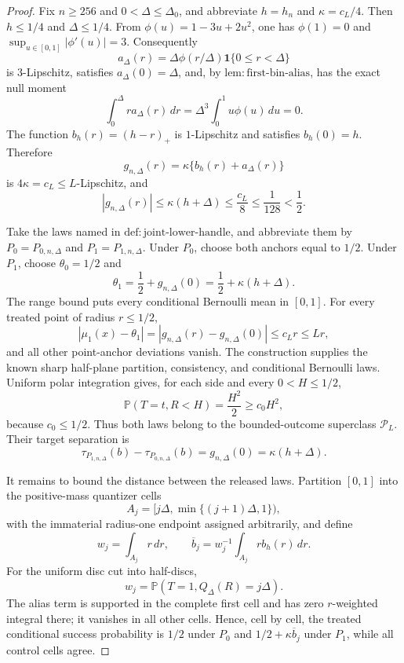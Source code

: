\documentclass{article}
\begin{document}
\begin{proof}
Fix \(n\geq256\) and \(0<\Delta\leq\Delta_0\), and abbreviate \(h=h_n\) and \(\kappa=c_L/4\).  Then \(h\leq1/4\) and \(\Delta\leq1/4\).  From \(\phi(u)=1-3u+2u^2\), one has \(\phi(1)=0\) and \(\sup_{u\in[0,1]}|\phi'(u)|=3\).  Consequently
\[
 a_\Delta(r)=\Delta\phi(r/\Delta)\mathbf1\{0\leq r<\Delta\}
\]
is \(3\)-Lipschitz, satisfies \(a_\Delta(0)=\Delta\), and, by \(\mathrm{lem:first\text{-}bin\text{-}alias}\), has the exact null moment
\[
 \int_0^\Delta ra_\Delta(r)\,dr
 =\Delta^3\int_0^1u\phi(u)\,du=0.
\]
The function \(b_h(r)=(h-r)_+\) is \(1\)-Lipschitz and satisfies \(b_h(0)=h\).  Therefore
\[
 g_{n,\Delta}(r)=\kappa\{b_h(r)+a_\Delta(r)\}
\]
is \(4\kappa=c_L\leq L\)-Lipschitz, and
\[
 |g_{n,\Delta}(r)|
 \leq\kappa(h+\Delta)
 \leq\frac{c_L}{8}
 \leq\frac1{128}<\frac12.
\]

Take the laws named in \(\mathrm{def:joint\text{-}lower\text{-}handle}\), and abbreviate them by \(P_0=P_{0,n,\Delta}\) and \(P_1=P_{1,n,\Delta}\).  Under \(P_0\), choose both anchors equal to \(1/2\).  Under \(P_1\), choose \(\theta_0=1/2\) and
\[
 \theta_1=\frac12+g_{n,\Delta}(0)
 =\frac12+\kappa(h+\Delta).
\]
The range bound puts every conditional Bernoulli mean in \([0,1]\).  For every treated point of radius \(r\leq1/2\),
\[
 |\mu_1(x)-\theta_1|
 =|g_{n,\Delta}(r)-g_{n,\Delta}(0)|
 \leq c_Lr\leq Lr,
\]
and all other point-anchor deviations vanish.  The construction supplies the known sharp half-plane partition, consistency, and conditional Bernoulli laws.  Uniform polar integration gives, for each side and every \(0<H\leq1/2\),
\[
 \mathbb P(T=t,R<H)=\frac{H^2}{2}\geq c_0H^2,
\]
because \(c_0\leq1/2\).  Thus both laws belong to the bounded-outcome superclass \(\mathcal P_L\).  Their target separation is
\[
 \tau_{P_{1,n,\Delta}}(b)-\tau_{P_{0,n,\Delta}}(b)
 =g_{n,\Delta}(0)=\kappa(h+\Delta).
\]

It remains to bound the distance between the released laws.  Partition \([0,1]\) into the positive-mass quantizer cells
\[
 A_j=[j\Delta,\min\{(j+1)\Delta,1\}),
\]
with the immaterial radius-one endpoint assigned arbitrarily, and define
\[
 w_j=\int_{A_j}r\,dr,
 \qquad
 \overline b_j=w_j^{-1}\int_{A_j}rb_h(r)\,dr.
\]
For the uniform disc cut into half-discs,
\[
 w_j=\mathbb P(T=1,Q_\Delta(R)=j\Delta).
\]
The alias term is supported in the complete first cell and has zero \(r\)-weighted integral there; it vanishes in all other cells.  Hence, cell by cell, the treated conditional success probability is \(1/2\) under \(P_0\) and \(1/2+\kappa\overline b_j\) under \(P_1\), while all control cells agree.


\end{proof}
\end{document}
